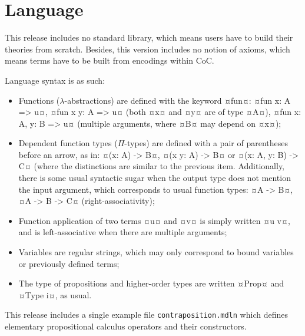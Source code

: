 \documentclass[twocolumn]{article}
\begin{document}
\section{Language}
This release includes no standard library, which means users have to build their
theories from scratch. Besides, this version includes no notion of axioms, which
means terms have to be built from encodings within CoC.

Language syntax is as such:
\begin{itemize}
	\item Functions (\(\lambda\)-abstractions) are defined with the keyword ¤fun¤:
		¤fun x: A => u¤, ¤fun x y: A => u¤ (both ¤x¤ and ¤y¤ are of type ¤A¤),
		¤fun x: A, y: B => u¤ (multiple arguments, where ¤B¤ may depend on ¤x¤);

	\item Dependent function types (\(\Pi\)-types) are defined with a pair of parentheses
		before an arrow, as in: ¤(x: A) -> B¤, ¤(x y: A) -> B¤ or
		¤(x: A, y: B) -> C¤ (where the distinctions are similar to the previous
		item. Additionally, there is some usual syntactic sugar when the output
		type does not mention the input argument, which corresponds to usual
		function types: ¤A -> B¤, ¤A -> B -> C¤ (right-associativity);

	\item Function application of two terms ¤u¤ and ¤v¤ is simply written ¤u v¤,
		and is left-associative when there are multiple arguments;

	\item Variables are regular strings, which may only correspond to bound
		variables or previously defined terms;

	\item The type of propositions and higher-order types are written ¤Prop¤ and
		¤Type i¤, as usual.
\end{itemize}

This release includes a single example file \texttt{contraposition.mdln} which
defines elementary propositional calculus operators and their constructors.
\end{document}
